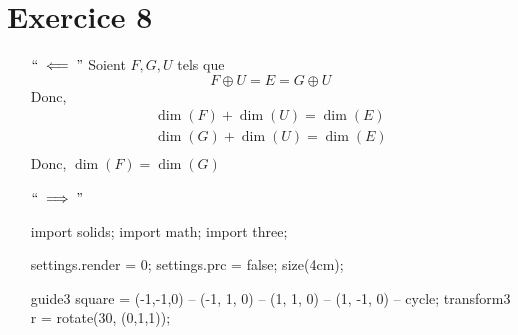 \part{Exercice 8}

\begin{itemize}
	\item[$``\impliedby"$] Soient $F, G, U$ tels que \[
			F \oplus U = E = G \oplus U
		\]
		Donc,
		\begin{align*}
			\dim(F)+\dim(U) = \dim(E)\\
			\dim(G)+\dim(U) = \dim(E)\\
		\end{align*}
		Donc, $\dim(F) = \dim(G)$
	\item[$``\implies"$]~\\
			\begin{center}
				\begin{asy}
					import solids;
					import math;
					import three;

					settings.render = 0;
					settings.prc = false;
					size(4cm);

					guide3 square = (-1,-1,0) -- (-1, 1, 0) -- (1, 1, 0) -- (1, -1, 0) -- cycle;
					transform3 r = rotate(30, (0,1,1));


\end{asy}
\end{center}
\end{itemize}

